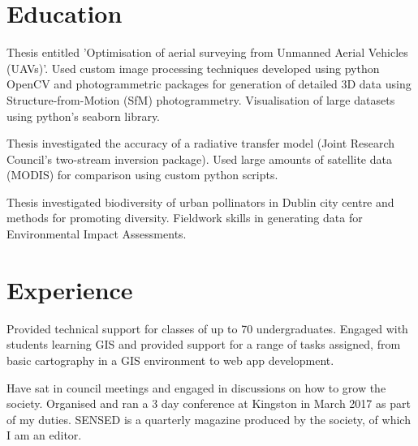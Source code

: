 \documentclass[]{JOC_CV}
\begin{document}
\hfill
\begin{minipage}[t]{0.66\textwidth}


\section{Education}\label{sec:education}

Thesis entitled 'Optimisation of aerial surveying from Unmanned Aerial Vehicles (UAVs)'.
Used custom image processing techniques developed using python OpenCV and photogrammetric packages for generation of detailed 3D data using Structure-from-Motion (SfM) photogrammetry.
Visualisation of large datasets using python's seaborn library.
\sectionsep

Thesis investigated the accuracy of a radiative transfer model (Joint Research Council's two-stream inversion package).
Used large amounts of satellite data (MODIS) for comparison using custom python scripts.
\sectionsep

Thesis investigated biodiversity of urban pollinators in Dublin city centre and methods for promoting diversity.
Fieldwork skills in generating data for Environmental Impact Assessments.
\sectionsep


\section{Experience}\label{sec:experience}

Provided technical support for classes of up to 70 undergraduates.
Engaged with students learning GIS and provided support
for a range of tasks assigned, from basic cartography in a GIS environment to web app development.
\sectionsep

\linebreak
{}
Have sat in council meetings and engaged in discussions on how to grow the society.
Organised and ran a 3 day conference at Kingston in March 2017 as part of my duties.
SENSED is a quarterly magazine produced by the society, of which I am an editor.
\sectionsep


\end{minipage}
\end{document}
